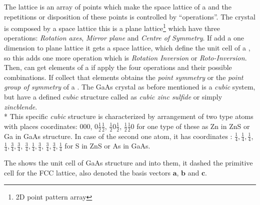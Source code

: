 The lattice is an array of points which make the space lattice of a \cry and the repetitions or disposition of these points is controlled by ``\sym operations''\cite{chatterjee2008crystallography}. The crystal is composed by a space lattice this is a plane lattice\footnote{2D point pattern array} which have three \sym operations: \emph{Rotation axes}, \emph{Mirror plane} and \emph{Centre of Symmetry}. If add a one dimension to plane lattice it gets a space lattice, which define the unit cell of a \cry, so this adds one more \sym operation which is \emph{Rotation Inversion} or \emph{Roto-Inversion}. Then, can get \sym elements of a \cry if  apply the four \sym operations and their possible combinations. If collect that \sym elements obtains the \emph{point symmetry} or the \emph{point group of symmetry} of a \cry. 
The GaAs crystal as before mentioned is a \emph{cubic} system, but have a defined $cubic$ structure  called  as \emph{cubic zinc sulfide} or simply \emph{zincblende}. \\*
This specific \emph{cubic} structure  is characterized by arrangement of two type atoms with places  coordinates: $000$, $0\frac{1}{2}\frac{1}{2}$,  $\frac{1}{2} 0\frac{1}{2}$, $\frac{1}{2} \frac{1}{2} 0$ for one type of these as Zn in ZnS or Ga in GaAs structure. In case of the second one atom, it has coordinates : $\frac{1}{4},\frac{1}{4},\frac{1}{4}$, $\frac{1}{4},\frac{3}{4},\frac{3}{4}$, $\frac{3}{4},\frac{1}{4}, \frac{3}{4}$, $\frac{3}{4},\frac{3}{4},\frac{1}{4}$ for S in ZnS or As in GaAs\cite{kittel2018kittel,mckelvey1966solid}. 

The  shows the unit cell of GaAs structure and into them, it  dashed the primitive cell for the FCC lattice, also denoted the basis vectors  $\mathbf{a}$, $\mathbf{b}$ and $\mathbf{c}$.

